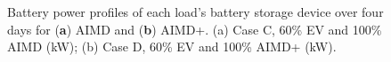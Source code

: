 \begin{figure}[htb]\centering
 \vspace{-3pt}
 \caption{Battery power profiles of each load's battery storage device over four days for (\textbf{a}) AIMD  and (\textbf{b}) AIMD+. ({a}) Case {C}, 60\% EV and 100\% AIMD (kW); ({b}) Case {D}, 60\% EV and 100\% AIMD+ (kW).}
 \label{ch1:fig:battery-utilisation-power}
\end{figure}

